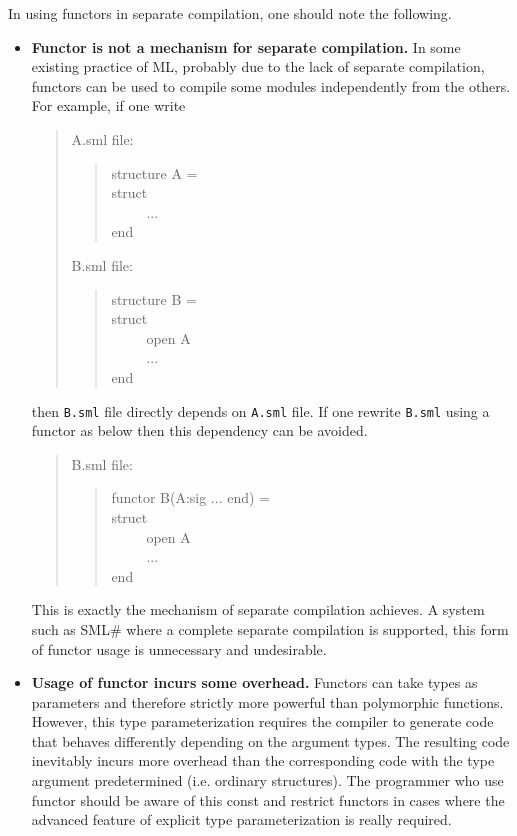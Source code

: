 \documentclass{jbook}
\newcommand{\smlsharp}{SML\#}
\newenvironment{program}{\begin{tt}\begin{quote}}{\end{quote}\end{tt}}
\newcommand{\myem}{\ \ \ \ \  }
\begin{document}
	In using functors in separate compilation, one should note the
following.
\begin{itemize}
\item {\bf Functor is not a mechanism for separate compilation.}
	In some existing practice of ML, probably due to the lack of
separate compilation, functors can be used to compile some modules
independently from the others.
	For example, if one write
\begin{quote}
\begin{minipage}{0.9\textwidth}
A.sml {\rm file:}
\begin{program}
structure A =\\
struct\\
\myem   ...\\
end
\end{program}
B.sml {\rm file:}
\begin{program}
structure B = \\
struct\\
\myem  open A\\
\myem  ...\\
end
\end{program}
\end{minipage}
\end{quote}
then {\tt B.sml} file directly depends on {\tt A.sml} file.
	If one rewrite {\tt B.sml} using a functor as below then this
dependency can be avoided.
\begin{quote}
\begin{minipage}{0.9\textwidth}
B.sml {\rm file:}
\begin{program}
functor B(A:sig ... end) = \\
struct\\
\myem  open A\\
\myem  ...\\
end
\end{program}
\end{minipage}
\end{quote}	
	This is exactly the mechanism of separate compilation achieves.
	A system such as \smlsharp{} where a complete separate
compilation is supported, this form of functor usage is unnecessary and
undesirable.

\item {\bf Usage of functor incurs some overhead.}
	Functors can take types as parameters and therefore strictly
more powerful than polymorphic functions.
	However, this type parameterization requires the compiler to
generate code that behaves differently depending on the argument types. 
	The resulting code  inevitably incurs more overhead than the
corresponding code with the type argument predetermined (i.e. ordinary
structures).
	The programmer who use functor should be aware of this const and
restrict functors in cases where the advanced feature of explicit type
parameterization is really required.
\end{itemize}
\fi%
\end{document}
